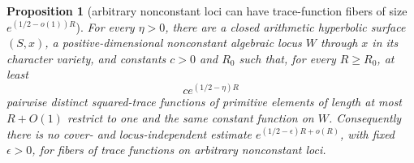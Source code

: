 \documentclass[11pt,reqno]{amsart}
\newtheorem{proposition}[theorem]{Proposition}
\theoremstyle{definition}
\theoremstyle{remark}
\begin{document}
\begin{proposition}[arbitrary nonconstant loci can have trace-function fibers of size \(e^{(1/2-o(1))R}\)]
\label{prop:no-uniform-locus-gap}
For every \(\eta>0\), there are a closed arithmetic hyperbolic surface
\((S,x)\), a positive-dimensional nonconstant algebraic locus
\(W\) through \(x\) in its character variety, and constants \(c>0\) and
\(R_0\) such that, for every \(R\ge R_0\), at least
\[
 c e^{(1/2-\eta)R}
\]
pairwise distinct squared-trace functions of primitive elements of length at
most \(R+O(1)\) restrict to one and the same constant function on \(W\).
Consequently there is no cover- and locus-independent estimate
\(e^{(1/2-\epsilon)R+o(R)}\), with fixed \(\epsilon>0\), for fibers of trace
functions on arbitrary nonconstant loci.
\end{proposition}
\end{document}
